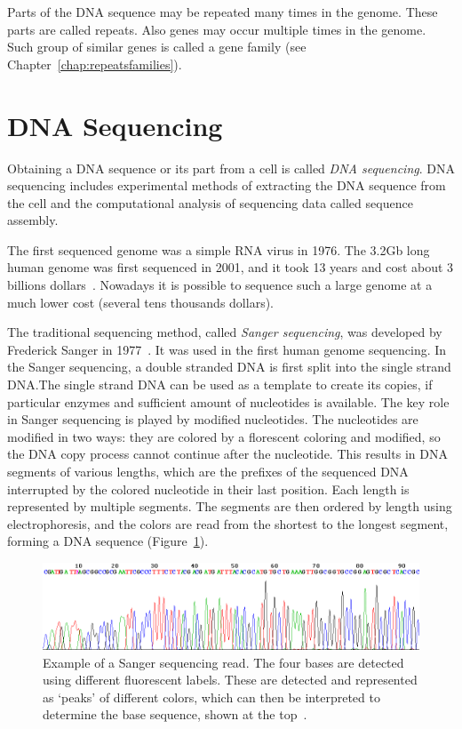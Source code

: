 Parts of the DNA sequence may be repeated many times in the genome. These parts are called repeats. Also genes may occur multiple times in the genome. Such group of similar genes is called a gene family (see Chapter~\ref{chap:repeatsfamilies}).

\section{DNA Sequencing}

Obtaining a DNA sequence or its part from a cell is called \emph{DNA sequencing}.
DNA sequencing includes experimental methods of extracting the DNA sequence from the cell and the computational analysis of sequencing data called sequence assembly.

The first sequenced genome was a simple RNA virus in 1976. The 3.2Gb long human genome was first sequenced in 2001, and it took 13 years and cost about 3 billions dollars~\cite{venter2001sequence}. Nowadays it is possible to sequence such a large genome at a much lower cost (several tens thousands dollars).

The traditional sequencing method, called \emph{Sanger sequencing}, was developed by Frederick Sanger in 1977~\cite{sanger1977dna}. It was used in the first human genome sequencing.
In the Sanger sequencing, a double stranded DNA is first split into the single strand DNA.\@ The single strand DNA can be used as a template to create its copies, if particular enzymes and sufficient amount of nucleotides is available. The key role in Sanger sequencing is played by modified nucleotides. The nucleotides are modified in two ways: they are colored by a florescent coloring and modified, so the DNA copy process cannot continue after the nucleotide. This results in DNA segments of various lengths, which are the prefixes of the sequenced DNA interrupted by the colored nucleotide in their last position. Each length is represented by multiple segments. The segments are then ordered by length using electrophoresis, and the colors are read from the shortest to the longest segment, forming a DNA sequence (Figure~\ref{fig:sanger}).

\begin{figure}[htbp]
  \centering
  \includegraphics[width=\textwidth]{../figures/sanger}
  \caption[Sanger sequencing]{Example of a Sanger sequencing read. The four bases are detected using different fluorescent labels. These are detected and represented as `peaks' of different colors, which can then be interpreted to determine the base sequence, shown at the top~\cite{wiki:sanger-img}.}\label{fig:sanger}
\end{figure}


